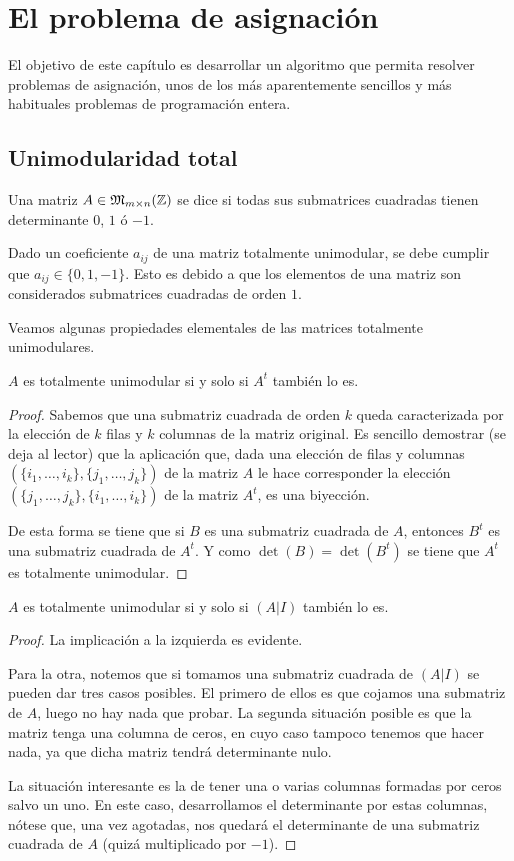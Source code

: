 \chapter{El problema de asignación}
\label{asig}
El objetivo de este capítulo es desarrollar un algoritmo que permita resolver problemas de asignación, unos de los más aparentemente sencillos y más habituales problemas de programación entera.
\section{Unimodularidad total}
\begin{defi}
	Una matriz $A\in\mathfrak{M}_{m\times n}(\mathbb{Z})$ se dice  si todas sus submatrices cuadradas tienen determinante $0$, $1$ ó $-1$.
\end{defi}
\begin{obs}
	Dado un coeficiente $a_{ij}$ de una matriz totalmente unimodular, se debe cumplir que $a_{ij}\in\{0,1,-1\}$. Esto es debido a que los elementos de una matriz son considerados submatrices cuadradas de orden $1$.
\end{obs}
Veamos algunas propiedades elementales de las matrices totalmente unimodulares.
\begin{lem}[Trasposición]
	$A$ es totalmente unimodular si y solo si $A^t$ también lo es.
\end{lem}
\begin{proof}
	Sabemos que una submatriz cuadrada de orden $k$ queda caracterizada por la elección de $k$ filas y $k$ columnas de la matriz original. Es sencillo demostrar (se deja al lector) que la aplicación que, dada una elección de filas y columnas $(\{i_1,\dots,i_k\},\{j_1,\dots,j_k\})$ de la matriz $A$ le hace corresponder la elección $(\{j_1,\dots,j_k\},\{i_1,\dots,i_k\})$ de la matriz $A^t$, es una biyección.
	
	De esta forma se tiene que si $B$ es una submatriz cuadrada de $A$, entonces $B^t$ es una submatriz cuadrada de $A^t$. Y como $\det(B)=\det(B^t)$ se tiene que $A^t$ es totalmente unimodular.
\end{proof}
\begin{lem}[Extensión]
	$A$ es totalmente unimodular si y solo si $(A|I)$ también lo es.
\end{lem}
\begin{proof}
	La implicación a la izquierda es evidente.
	
	Para la otra, notemos que si tomamos una submatriz cuadrada de $(A|I)$ se pueden dar tres casos posibles. El primero de ellos es que cojamos una submatriz de $A$, luego no hay nada que probar. La segunda situación posible es que la matriz tenga una columna de ceros, en cuyo caso tampoco tenemos que hacer nada, ya que dicha matriz tendrá determinante nulo.
	
	La situación interesante es la de tener una o varias columnas formadas por ceros salvo un uno. En este caso, desarrollamos el determinante por estas columnas, nótese que, una vez agotadas, nos quedará el determinante de una submatriz cuadrada de $A$ (quizá multiplicado por $-1$).
\end{proof}
